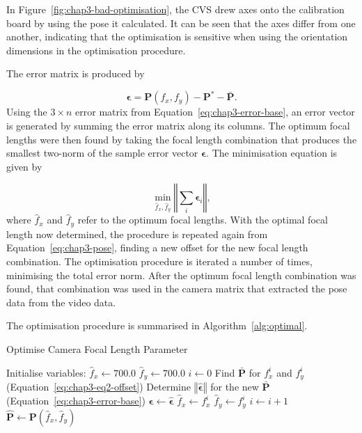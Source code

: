 In Figure~\ref{fig:chap3-bad-optimisation}, the CVS drew axes onto the calibration board by using the pose it calculated. It can be seen that the axes differ from one another, indicating that the optimisation is sensitive when using the orientation dimensions in the optimisation procedure. 

The error matrix is produced by

\begin{equation}
  \label{eq:chap3-error-base}
  \bm{\epsilon} = \bm{P}(f_x, f_y) - \bm{P}^* - \bar{\bm{P}}.
\end{equation}
Using the $3\times n$ error matrix from Equation~\ref{eq:chap3-error-base}, an error vector is generated by summing the error matrix along its columns. The optimum focal lengths were then found by taking the focal length combination that produces the smallest two-norm of the sample error vector $\bm{\epsilon}$. The minimisation equation is given by 

\begin{equation}
  \label{eq:chap3-err-min}
  \min_{\hat{f}_x, \hat{f}_y}\left \Vert \sum_i  \bm{\epsilon}_i \right \Vert,
\end{equation}
where $\hat{f}_x$ and $\hat{f}_y$ refer to the optimum focal lengths. With the optimal focal length now determined, the procedure is repeated again from Equation~\ref{eq:chap3-pose}, finding a new offset for the new focal length combination. The optimisation procedure is iterated a number of times, minimising the total error norm. After the optimum focal length combination was found, that combination was used in the camera matrix that extracted the pose data from the video data.

The optimisation procedure is summarised in Algorithm~\ref{alg:optimal}. 

\begin{algorithm}
  \centering
  \caption{Optimise Camera Focal Length Parameter}
  \label{alg:optimal}
  \begin{algorithmic}
    \State Initialise variables: 
      \State $\hat{f}_x \gets 700.0$
      \State $\hat{f}_y \gets 700.0$
      \State $i \gets 0$
      \State Find $\bm{\bar{P}}$ for $f_x^i$ and $f_y^i$ (Equation~\ref{eq:chap3-eq2-offset})
      \State Determine $\left \Vert \hat{\bm{\epsilon}} \right \Vert$ for the new $\bm{\bar{P}}$ (Equation~\ref{eq:chap3-error-base})
      \If{$\left \Vert \hat{\bm{\epsilon}} \right \Vert < \left \Vert \bm{\epsilon} \right \Vert$}
        \State $\bm{\epsilon} \gets \hat{\bm{\epsilon}}$
	\State $\hat{f}_x \gets f_x^i$
	\State $\hat{f}_y \gets f_y^i$
      \EndIf
      \State $i \gets i + 1$
    \EndWhile
    \State $\hat{\bm{P}} \gets \bm{P}(\hat{f}_x, \hat{f}_y)$
  \end{algorithmic}
\end{algorithm}

